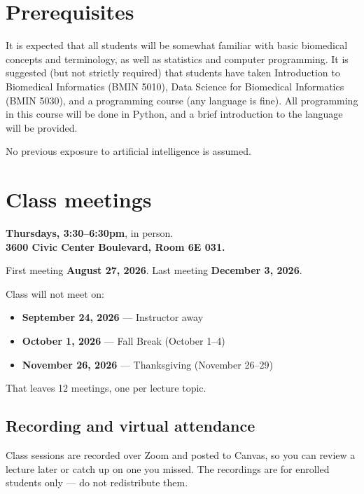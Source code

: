 \documentclass[11pt]{article}
\begin{document}
\section{Prerequisites}

It is expected that all students will be somewhat familiar with basic biomedical concepts and
terminology, as well as statistics and computer programming. It is suggested (but not strictly
required) that students have taken Introduction to Biomedical Informatics (BMIN 5010), Data
Science for Biomedical Informatics (BMIN 5030), and a programming course (any language is fine).
All programming in this course will be done in Python, and a brief introduction to the language
will be provided.

No previous exposure to artificial intelligence is assumed.

\section{Class meetings}

\textbf{Thursdays, 3:30--6:30pm}, in person.\\
\textbf{3600 Civic Center Boulevard, Room 6E 031.}

First meeting \textbf{August 27, 2026}. Last meeting \textbf{December 3, 2026}.

Class will not meet on:

\begin{itemize}
  \item \textbf{September 24, 2026} --- Instructor away
  \item \textbf{October 1, 2026} --- Fall Break (October 1--4)
  \item \textbf{November 26, 2026} --- Thanksgiving (November 26--29)
\end{itemize}

That leaves 12 meetings, one per lecture topic.

\subsection{Recording and virtual attendance}

Class sessions are recorded over Zoom and posted to Canvas, so you can review a lecture later or
catch up on one you missed. The recordings are for enrolled students only --- do not redistribute
them.
\end{document}
